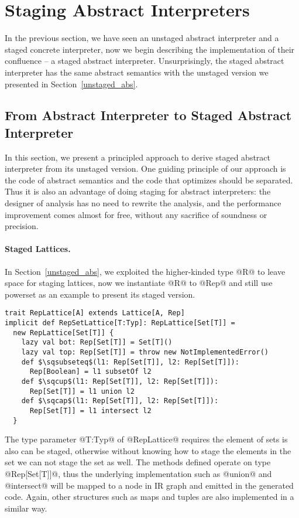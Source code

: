 \section{Staging Abstract Interpreters} \label{sai}

In the previous section, we have seen an unstaged abstract interpreter and a staged concrete interpreter, 
now we begin describing the implementation of their confluence -- a staged abstract interpreter. 
Unsurprisingly, the staged abstract interpreter has the same abstract semantics with the unstaged version
we presented in Section~\ref{unstaged_abs}.

\subsection{From Abstract Interpreter to Staged Abstract Interpreter}

In this section, we present a principled approach to derive staged abstract interpreter
from its unstaged version. One guiding principle of our approach is the code of abstract semantics
and the code that optimizes should be separated. Thus it is also an advantage of doing staging 
for abstract interpreters: the designer of analysis has no need to rewrite the analysis, and 
the performance improvement comes almost for free, without any sacrifice of soundness or precision.

\paragraph{Staged Lattices.} In Section~\ref{unstaged_abs}, we exploited the higher-kinded type @R@
to leave space for staging lattices, now we instantiate @R@ to @Rep@ and still use powerset as an 
example to present its staged version. 

\begin{lstlisting}
trait RepLattice[A] extends Lattice[A, Rep]
implicit def RepSetLattice[T:Typ]: RepLattice[Set[T]] = 
  new RepLattice[Set[T]] {
    lazy val bot: Rep[Set[T]] = Set[T]()
    lazy val top: Rep[Set[T]] = throw new NotImplementedError()
    def $\sqsubseteq$(l1: Rep[Set[T]], l2: Rep[Set[T]]): 
      Rep[Boolean] = l1 subsetOf l2
    def $\sqcup$(l1: Rep[Set[T]], l2: Rep[Set[T]]): 
      Rep[Set[T]] = l1 union l2
    def $\sqcap$(l1: Rep[Set[T]], l2: Rep[Set[T]]): 
      Rep[Set[T]] = l1 intersect l2
  }
\end{lstlisting}

The type parameter @T:Typ@ of @RepLattice@ requires the element of sets
is also can be staged, otherwise without knowing how to stage the elements in the set
we can not stage the set as well.
The methods defined operate on type @Rep[Set[T]]@, thus the underlying implementation
such as @union@ and @intersect@ will be mapped to a node in IR graph and emitted in 
the generated code. Again, other structures such as maps and tuples are also implemented
in a similar way.

